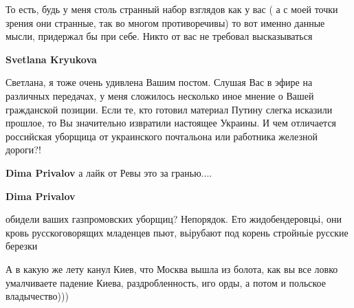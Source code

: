 \begin{itemize}
\begin{itemize}
То есть, будь у меня столь странный набор взглядов как у вас ( а с моей точки
зрения они странные, так во многом противоречивы) то вот именно данные мысли,
придержал бы при себе. Никто от вас не требовал высказываться

 
\textbf{Svetlana Kryukova}

Светлана, я тоже очень удивлена Вашим постом. Слушая Вас в эфире на различных
передачах, у меня сложилось несколько иное мнение о Вашей гражданской позиции.
Если те, кто готовил материал Путину слегка исказили прошлое, то Вы значительно
извратили настоящее Украины. И чем отличается российская уборщица от
украинского почтальона или работника железной дороги?!


 
\textbf{Dima Privalov} а лайк от Ревы это за гранью....

 
\textbf{Dima Privalov} 

обидели ваших газпромовских уборщиц? Непорядок. Ето жидобендеровцьі, они кровь
русскоговорящих младенцев пьют, вьірубают под корень стройньіе русские березки

 
А в какую же лету канул Киев, что Москва вышла из болота, как вы все ловко умалчиваете падение Киева, раздробленность, иго орды, а потом и польское владычество)))

 

\end{itemize}
\end{itemize}
